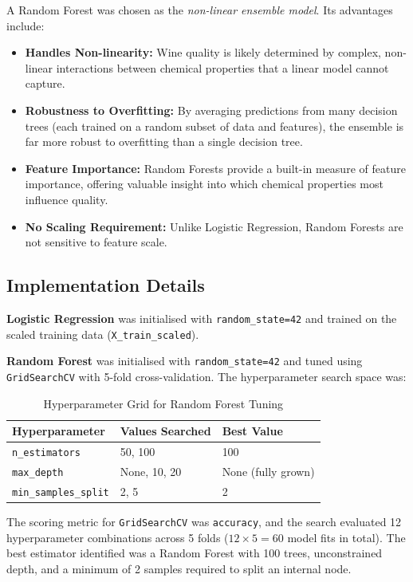 \documentclass[11pt,a4paper]{article}
\begin{document}
A Random Forest was chosen as the \textit{non-linear ensemble model}. Its advantages include:
\begin{itemize}
    \item \textbf{Handles Non-linearity:} Wine quality is likely determined by complex, non-linear interactions between chemical properties that a linear model cannot capture.
    \item \textbf{Robustness to Overfitting:} By averaging predictions from many decision trees (each trained on a random subset of data and features), the ensemble is far more robust to overfitting than a single decision tree.
    \item \textbf{Feature Importance:} Random Forests provide a built-in measure of feature importance, offering valuable insight into which chemical properties most influence quality.
    \item \textbf{No Scaling Requirement:} Unlike Logistic Regression, Random Forests are not sensitive to feature scale.
\end{itemize}

\subsection{Implementation Details}

\textbf{Logistic Regression} was initialised with \texttt{random\_state=42} and trained on the scaled training data (\texttt{X\_train\_scaled}).

\textbf{Random Forest} was initialised with \texttt{random\_state=42} and tuned using \texttt{GridSearchCV} with 5-fold cross-validation. The hyperparameter search space was:

\begin{table}[H]
    \centering
    \caption{Hyperparameter Grid for Random Forest Tuning}
    \label{tab:gridsearch}
    \begin{tabular}{lll}
        \toprule
        \textbf{Hyperparameter} & \textbf{Values Searched} & \textbf{Best Value} \\
        \midrule
        \texttt{n\_estimators} & 50, 100 & 100 \\
        \texttt{max\_depth} & None, 10, 20 & None (fully grown) \\
        \texttt{min\_samples\_split} & 2, 5 & 2 \\
        \bottomrule
    \end{tabular}
\end{table}

The scoring metric for \texttt{GridSearchCV} was \texttt{accuracy}, and the search evaluated 12 hyperparameter combinations across 5 folds ($12 \times 5 = 60$ model fits in total). The best estimator identified was a Random Forest with 100 trees, unconstrained depth, and a minimum of 2 samples required to split an internal node.
\end{document}
